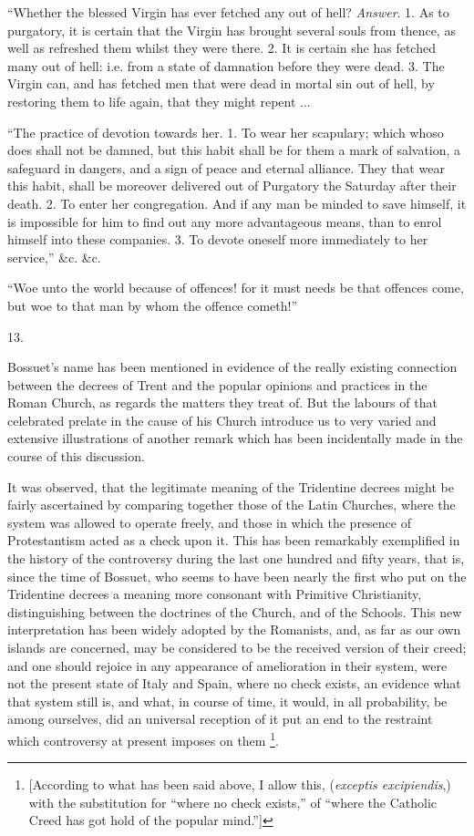 ``Whether
the blessed Virgin has ever fetched any out of hell? \emph{Answer}. 1.
As to purgatory, it is certain that the Virgin has brought several
souls from thence, as well as refreshed them whilst they were there.
2. It is certain she has fetched many out of hell: i.e. from a state
of damnation before they were dead. 3. The Virgin can, and has fetched
men that were dead in mortal sin out of hell, by restoring them to
life again, that they might repent ...

``The
practice of devotion towards her. 1. To wear her scapulary; which
whoso does shall not be damned, but this habit shall be for them a
mark of salvation, a safeguard in dangers, and a sign of peace and
eternal alliance. They that wear this habit, shall be moreover
delivered out of Purgatory the Saturday after their death. 2. To enter
her congregation. And if any man be minded to save himself, it is
impossible for him to find out any more advantageous means, than to
enrol himself into these companies. 3. To devote oneself more
immediately to her service,'' \&c. \&c.

``Woe unto the world because of offences! for it
must needs be that offences come, but woe to that man by whom the
offence cometh!''

13.

Bossuet's name has been mentioned in evidence of
the really existing connection between the decrees of Trent and the
popular opinions and practices in the Roman Church, as regards the
matters they treat of. But the labours of that celebrated prelate in
the cause of his Church introduce us to very varied and extensive
illustrations of another remark which has been incidentally made
in the course of this discussion.

It was observed, that the legitimate meaning of
the Tridentine decrees might be fairly ascertained by comparing
together those of the Latin Churches, where the system was allowed to
operate freely, and those in which the presence of Protestantism acted
as a check upon it. This has been remarkably exemplified in the
history of the controversy during the last one hundred and fifty
years, that is, since the time of Bossuet, who seems to have been
nearly the first who put on the Tridentine decrees a meaning more
consonant with Primitive Christianity, distinguishing between the
doctrines of the Church, and of the Schools. This new interpretation
has been widely adopted by the Romanists, and, as far as our own
islands are concerned, may be considered to be the received version of
their creed; and one should rejoice in any appearance of amelioration
in their system, were not the present state of Italy and Spain, where
no check exists, an evidence what that system still is, and what, in
course of time, it would, in all probability, be among ourselves, did
an universal reception of it put an end to the restraint which
controversy at present imposes on them \footnote{[According to what has been said above, I allow this, (\emph{exceptis
excipiendis},) with the substitution for ``where no check exists,''
of ``where the Catholic Creed has got hold of the popular mind.'']}.

